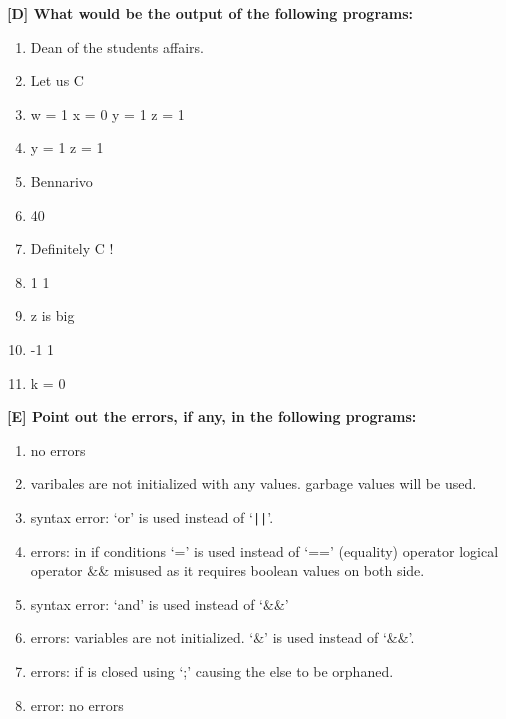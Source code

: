 \documentclass{report}
\begin{document}
\textbf{[D] What would be the output of the following programs:}
\begin{enumerate}
    \renewcommand{\labelenumi}{\alph{enumi}}
  \item Dean of the students affairs.
  \item Let us C
  \item w = 1 x = 0 y = 1 z = 1
  \item y = 1 z = 1
  \item Bennarivo
  \item 40
  \item Definitely C !
  \item 1 1
  \item z is big
  \item -1 1
  \item k = 0
\end{enumerate}

\textbf{[E] Point out the errors, if any, in the following programs:}
\begin{enumerate}
    \renewcommand{\labelenumi}{\alph{enumi}}
  \item no errors
  \item varibales are not initialized with any values. garbage values will be used.
  \item syntax error: `or' is used instead of `\texttt{||}'.
  \item errors: 
    \subitem in if conditions `=' is used instead of `==' (equality) operator
    \subitem logical operator \&\& misused as it requires boolean values on both side.
  \item syntax error: `and' is used instead of `\&\&'
  \item errors: 
    \subitem variables are not initialized.
    \subitem `\&' is used instead of `\&\&'.
  \item errors:
    \subitem if is closed using `;' causing the else to be orphaned.
  \item error: no errors
\end{enumerate}
\end{document}
